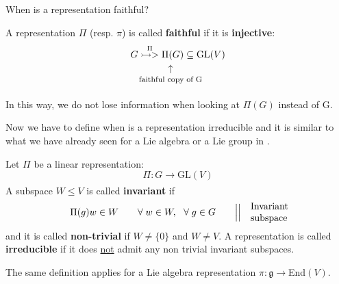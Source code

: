 \documentclass[../main.tex]{subfiles}
\begin{document}
When is a representation faithful?
\begin{definition}[Faithful]
A representation $\Pi$ (resp. $\pi$) is called \textbf{faithful} if it is \textbf{injective}:
\[
G\overset{\Pi}{\rightarrowtail>}\Pi\underset{\mathclap{\tikz \node {$\uparrow$} node [below=1ex] {\footnotesize faithful copy of G };}}(G)\subseteq\text{GL}(V)
\]
\end{definition}
In this way, we do not lose information when looking at $\Pi(G)$ instead of G.

Now we have to define when is a representation irreducible and it is similar to what we have already seen for a Lie algebra or a Lie group in .
\begin{definition}[Irreducible representation =: irreps]
Let $\Pi$ be a linear representation:
\[
\Pi:G\xrightarrow[]{}\text{GL}(V)
\]
A subspace $W\le V$ is called \textbf{invariant} if 
\[
\Pi(g)w\in W \qquad \forall\;w\in W,\ \ \forall\;g\in G \qquad \Big|\Big|\quad \text{\parbox{1.3cm}{Invariant\\subspace}}
\]
and it is called \textbf{non-trivial} if $W\ne\{0\}$ and $W\ne V$. A representation is called \textbf{irreducible} if it does \underline{not} admit any non trivial invariant subspaces.
\end{definition}
The same definition applies for a Lie algebra representation $\pi:\mathfrak{g}\xrightarrow[]{}$End$(V)$.
\end{document}
